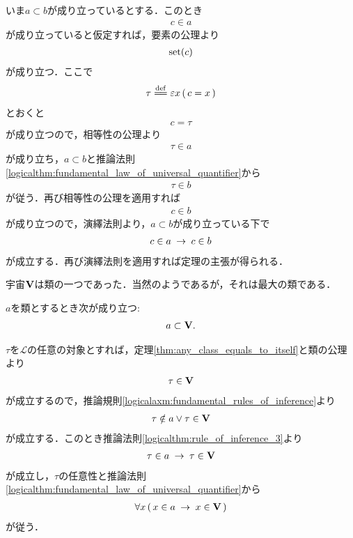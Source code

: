 	\begin{prf}	
		いま$a \subset b$が成り立っているとする．このとき
		\begin{align}
			c \in a
		\end{align}
		が成り立っていると仮定すれば，要素の公理より
		\begin{align}
			\operatorname*{set} (c)
		\end{align}
		が成り立つ．ここで
		\begin{align}
			\tau \defeq \varepsilon x\, (\, c=x\, )
		\end{align}
		とおくと
		\begin{align}
			c = \tau
		\end{align}
		が成り立つので，相等性の公理より
		\begin{align}
			\tau \in a
		\end{align}
		が成り立ち，$a \subset b$と推論法則\ref{logicalthm:fundamental_law_of_universal_quantifier}から
		\begin{align}
			\tau \in b
		\end{align}
		が従う．再び相等性の公理を適用すれば
		\begin{align}
			c \in b
		\end{align}
		が成り立つので，演繹法則より，$a \subset b$が成り立っている下で
		\begin{align}
			c \in a \hspace{0.25em}\rightarrow\hspace{0.25em} c \in b
		\end{align}
		が成立する．再び演繹法則を適用すれば定理の主張が得られる．
		\QED
	\end{prf}
	
	宇宙$\mathbf{V}$は類の一つであった．当然のようであるが，それは最大の類である．
	\begin{screen}
		\begin{thm}
			$a$を類とするとき次が成り立つ:
			\begin{align}
				a \subset \mathbf{V}.
			\end{align}
		\end{thm}
	\end{screen}
	
	\begin{prf}
		$\tau$を$\mathcal{L}$の任意の対象とすれば，定理\ref{thm:any_class_equals_to_itself}と類の公理より
		\begin{align}
			\tau \in \mathbf{V}
		\end{align}
		が成立するので，推論規則\ref{logicalaxm:fundamental_rules_of_inference}より
		\begin{align}
			\tau \notin a \vee \tau \in \mathbf{V}
		\end{align}
		が成立する．このとき推論法則\ref{logicalthm:rule_of_inference_3}より
		\begin{align}
			\tau \in a \hspace{0.25em}\rightarrow\hspace{0.25em} \tau \in \mathbf{V}
		\end{align}
		が成立し，$\tau$の任意性と推論法則\ref{logicalthm:fundamental_law_of_universal_quantifier}から
		\begin{align}
			\forall x\, (\, x \in a \hspace{0.25em}\rightarrow\hspace{0.25em} x \in \mathbf{V}\, )
		\end{align}
		が従う．
		\QED
	\end{prf}
	
